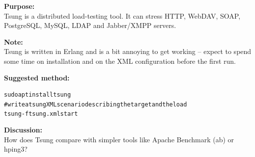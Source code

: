 \documentclass[a4paper,11pt,notitlepage]{report}
\begin{document}
{\bf Purpose:}\\
Tsung is a distributed load-testing tool. It can stress HTTP, WebDAV, SOAP,
PostgreSQL, MySQL, LDAP and Jabber/XMPP servers.\\

{\bf Note:}\\
Tsung is written in Erlang and is a bit annoying to get working -- expect to
spend some time on installation and on the XML configuration before the first run.

{\bf Suggested method:}\\
\begin{alltt}
sudo apt install tsung
# write a tsung XML scenario describing the target and the load
tsung -f tsung.xml start
\end{alltt}

{\bf Discussion:}\\
How does Tsung compare with simpler tools like Apache Benchmark (ab) or hping3?
\end{document}
